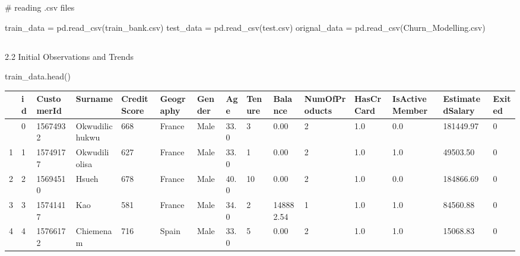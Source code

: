 \documentclass[
  letterpaper,
  DIV=11,
  numbers=noendperiod]{scrartcl}
\newenvironment{Shaded}{\begin{snugshade}}{\end{snugshade}}
\newcommand{\CommentTok}[1]{\textcolor[rgb]{0.37,0.37,0.37}{#1}}
\newcommand{\NormalTok}[1]{\textcolor[rgb]{0.00,0.23,0.31}{#1}}
\newcommand{\OperatorTok}[1]{\textcolor[rgb]{0.37,0.37,0.37}{#1}}
\newcommand{\StringTok}[1]{\textcolor[rgb]{0.13,0.47,0.30}{#1}}
\begin{document}
\begin{Shaded}
\begin{Highlighting}[]
\CommentTok{\# reading .csv files}

\NormalTok{train\_data }\OperatorTok{=}\NormalTok{ pd.read\_csv(}\StringTok{\textquotesingle{}train\_bank.csv\textquotesingle{}}\NormalTok{)}
\NormalTok{test\_data }\OperatorTok{=}\NormalTok{ pd.read\_csv(}\StringTok{\textquotesingle{}test.csv\textquotesingle{}}\NormalTok{)}
\NormalTok{orignal\_data }\OperatorTok{=}\NormalTok{ pd.read\_csv(}\StringTok{\textquotesingle{}Churn\_Modelling.csv\textquotesingle{}}\NormalTok{)}

\end{Highlighting}
\end{Shaded}

\hypertarget{section-3}{%
\subsection{}\label{section-3}}

2.2 Initial Observations and Trends

\begin{Shaded}
\begin{Highlighting}[]
\NormalTok{train\_data.head()}
\end{Highlighting}
\end{Shaded}

\begin{longtable}[]{@{}lllllllllllllll@{}}
\toprule\noalign{}
& id & CustomerId & Surname & CreditScore & Geography & Gender & Age &
Tenure & Balance & NumOfProducts & HasCrCard & IsActiveMember &
EstimatedSalary & Exited \\
\midrule\noalign{}
\endhead
\bottomrule\noalign{}
\endlastfoot
0 & 0 & 15674932 & Okwudilichukwu & 668 & France & Male & 33.0 & 3 &
0.00 & 2 & 1.0 & 0.0 & 181449.97 & 0 \\
1 & 1 & 15749177 & Okwudiliolisa & 627 & France & Male & 33.0 & 1 & 0.00
& 2 & 1.0 & 1.0 & 49503.50 & 0 \\
2 & 2 & 15694510 & Hsueh & 678 & France & Male & 40.0 & 10 & 0.00 & 2 &
1.0 & 0.0 & 184866.69 & 0 \\
3 & 3 & 15741417 & Kao & 581 & France & Male & 34.0 & 2 & 148882.54 & 1
& 1.0 & 1.0 & 84560.88 & 0 \\
4 & 4 & 15766172 & Chiemenam & 716 & Spain & Male & 33.0 & 5 & 0.00 & 2
& 1.0 & 1.0 & 15068.83 & 0 \\
\end{longtable}
\end{document}
